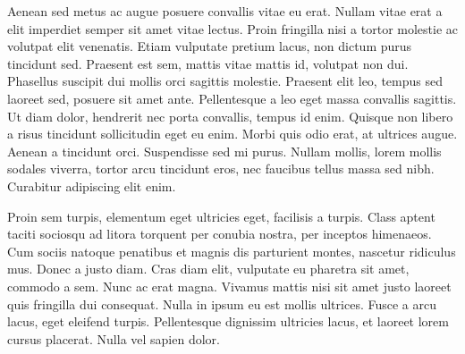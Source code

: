 Aenean sed metus ac augue posuere convallis vitae eu erat. Nullam vitae erat a elit imperdiet semper sit amet vitae lectus. Proin fringilla nisi a tortor molestie ac volutpat elit venenatis. Etiam vulputate pretium lacus, non dictum purus tincidunt sed. Praesent est sem, mattis vitae mattis id, volutpat non dui. Phasellus suscipit dui mollis orci sagittis molestie. Praesent elit leo, tempus sed laoreet sed, posuere sit amet ante. Pellentesque a leo eget massa convallis sagittis. Ut diam dolor, hendrerit nec porta convallis, tempus id enim. Quisque non libero a risus tincidunt sollicitudin eget eu enim. Morbi quis odio erat, at ultrices augue. Aenean a tincidunt orci. Suspendisse sed mi purus. Nullam mollis, lorem mollis sodales viverra, tortor arcu tincidunt eros, nec faucibus tellus massa sed nibh. Curabitur adipiscing elit enim. 

Proin sem turpis, elementum eget ultricies eget, facilisis a turpis. Class aptent taciti sociosqu ad litora torquent per conubia nostra, per inceptos himenaeos. Cum sociis natoque penatibus et magnis dis parturient montes, nascetur ridiculus mus. Donec a justo diam. Cras diam elit, vulputate eu pharetra sit amet, commodo a sem. Nunc ac erat magna. Vivamus mattis nisi sit amet justo laoreet quis fringilla dui consequat. Nulla in ipsum eu est mollis ultrices. Fusce a arcu lacus, eget eleifend turpis. Pellentesque dignissim ultricies lacus, et laoreet lorem cursus placerat. Nulla vel sapien dolor. 
